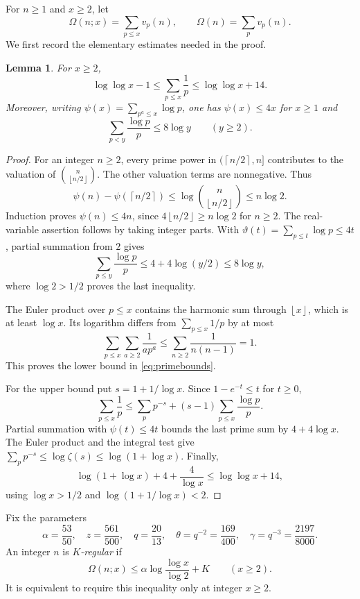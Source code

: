\documentclass[11pt]{amsart}
\newtheorem{lemma}[theorem]{Lemma}
\theoremstyle{definition}
\theoremstyle{remark}
\numberwithin{equation}{section}
\newcommand{\Om}{\Omega}
\newcommand{\floor}[1]{\left\lfloor #1\right\rfloor}
\newcommand{\ceil}[1]{\left\lceil #1\right\rceil}
\begin{document}
For $n\ge1$ and $x\ge2$, let
\[
\Om(n;x)=\sum_{p\le x}v_p(n),\qquad \Om(n)=\sum_pv_p(n).
\]
We first record the elementary estimates needed in the proof.

\begin{lemma}\label{lem:primebounds}
For $x\ge2$,
\begin{equation}\label{eq:primebounds}
\log\log x-1\le\sum_{p\le x}\frac1p\le\log\log x+14.
\end{equation}
Moreover, writing $\psi(x)=\sum_{p^a\le x}\log p$, one has $\psi(x)\le4x$ for $x\ge1$ and
\begin{equation}\label{eq:primelog}
\sum_{p<y}\frac{\log p}{p}\le8\log y\qquad(y\ge2).
\end{equation}
\end{lemma}

\begin{proof}
For an integer $n\ge2$, every prime power in $(\ceil{n/2},n]$ contributes to the valuation of $\binom n{\floor{n/2}}$.
The other valuation terms are nonnegative. Thus
\[
\psi(n)-\psi(\ceil{n/2})\le\log\binom n{\floor{n/2}}\le n\log2.
\]
Induction proves $\psi(n)\le4n$, since $4\floor{n/2}\ge n\log2$ for $n\ge2$.
The real-variable assertion follows by taking integer parts.
With $\vartheta(t)=\sum_{p\le t}\log p\le4t$, partial summation from $2$ gives
\[
\sum_{p\le y}\frac{\log p}{p}
\le4+4\log(y/2)\le8\log y,
\]
where $\log2>1/2$ proves the last inequality.

The Euler product over $p\le x$ contains the harmonic sum through $\floor x$, which is at least $\log x$.
Its logarithm differs from $\sum_{p\le x}1/p$ by at most
\[
\sum_{p\le x}\sum_{a\ge2}\frac1{ap^a}
\le\sum_{n\ge2}\frac1{n(n-1)}=1.
\]
This proves the lower bound in \eqref{eq:primebounds}.

For the upper bound put $s=1+1/\log x$.
Since $1-e^{-t}\le t$ for $t\ge0$,
\[
\sum_{p\le x}\frac1p
\le\sum_p p^{-s}+(s-1)\sum_{p\le x}\frac{\log p}{p}.
\]
Partial summation with $\psi(t)\le4t$ bounds the last prime sum by $4+4\log x$.
The Euler product and the integral test give
$\sum_p p^{-s}\le\log\zeta(s)\le\log(1+\log x)$.
Finally,
\[
\log(1+\log x)+4+\frac4{\log x}
\le\log\log x+14,
\]
using $\log x>1/2$ and $\log(1+1/\log x)<2$.
\end{proof}

Fix the parameters
\begin{equation}\label{eq:params}
\alpha=\frac{53}{50},\quad z=\frac{561}{500},\quad q=\frac{20}{13},
\quad\theta=q^{-2}=\frac{169}{400},\quad\gamma=q^{-3}=\frac{2197}{8000}.
\end{equation}
An integer $n$ is \emph{$K$-regular} if
\begin{equation}\label{eq:regular}
\Om(n;x)\le\alpha\log\frac{\log x}{\log2}+K\qquad(x\ge2).
\end{equation}
It is equivalent to require this inequality only at integer $x\ge2$.
\end{document}
